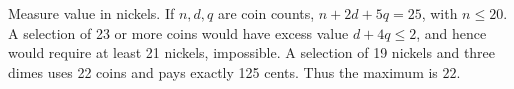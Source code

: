Measure value in nickels. If $n,d,q$ are coin counts, $n+2d+5q=25$, with $n\le20$. A selection of 23 or more coins would have excess value $d+4q\le2$, and hence would require at least 21 nickels, impossible. A selection of 19 nickels and three dimes uses 22 coins and pays exactly 125 cents. Thus the maximum is $\boxed{22}$.
